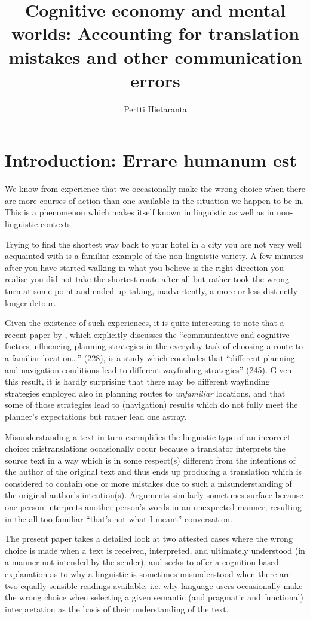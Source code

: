 \documentclass[output=paper]{LSP/langsci}
\title{Cognitive economy and mental worlds: Accounting for translation mistakes and other communication errors}
\author{Pertti Hietaranta
\affiliation{University of Helsinki}    
}
\begin{document}
\section{Introduction: Errare humanum est}\label{hietaranta:sec:1}

We know from experience that we occasionally make the wrong choice when there are more courses of action than one available in the situation we happen to be in. This is a phenomenon which makes itself known in linguistic as well as in non-linguistic contexts.


Trying to find the shortest way back to your hotel in a city you are not very well acquainted with is a familiar example of the non-linguistic variety. A few minutes after you have started walking in what you believe is the right direction you realise you did not take the shortest route after all but rather took the wrong turn at some point and ended up taking, inadvertently, a more or less distinctly longer detour.


Given the existence of such experiences, it is quite interesting to note that a recent paper by \citet{Holscher2011}, which explicitly discusses the ``communicative and cognitive factors influencing planning strategies in the everyday task of choosing a route to a familiar location\ldots'' (228), is a study which concludes that ``different planning and navigation conditions lead to different wayfinding strategies'' (245). Given this result, it is hardly surprising that there may be different wayfinding strategies employed also in planning routes to \textit{unfamiliar} locations, and that some of those strategies lead to (navigation) results which do not fully meet the planner's expectations but rather lead one astray.


Misunderstanding a text in turn exemplifies the linguistic type of an incorrect choice: mistranslations occasionally occur because a translator interprets the source text in a way which is in some respect(s) different from the intentions of the author of the original text and thus ends up producing a translation which is considered to contain one or more mistakes due to such a misunderstanding of the original author's intention(s). Arguments similarly sometimes surface because one person interprets another person's words in an unexpected manner, resulting in the all too familiar ``that's not what I meant'' conversation.


The present paper takes a detailed look at two attested cases where the wrong choice is made when a text is received, interpreted, and ultimately understood (in a manner not intended by the sender), and seeks to offer a cognition-based explanation as to why a linguistic  is sometimes misunderstood when there are two equally sensible readings available, i.e. why language users occasionally make the wrong choice when selecting a given semantic (and pragmatic and functional) interpretation as the basis of their understanding of the text.
 
\end{document}
